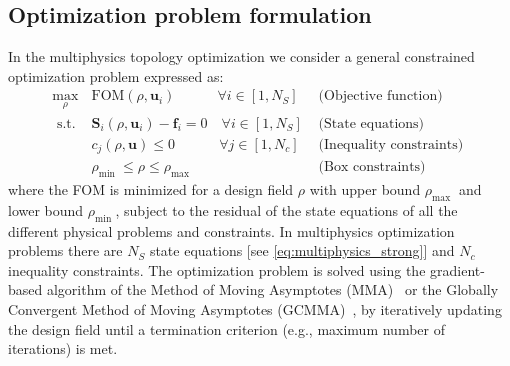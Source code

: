     \subsection*{Optimization problem formulation}
    In the multiphysics topology optimization we consider a general constrained optimization problem 
    expressed as:
    \begin{equation}
        \begin{array}{clr}
            \max\limits_{\rho}                        & \text{FOM}(\rho, \mathbf{u}_i) \quad \quad \quad 
             \forall i \in\left[1, N_S\right] & \text { (Objective function) }                                                         \\
            \text { s.t. }                            & \mathbf{S}_i(\rho, \mathbf{u}_i)-\mathbf{f}_i=0 \quad
            \forall i \in\left[1, N_S\right]          & \text { (State equations) }                                                            \\
                                                      & c_j(\rho, \mathbf{u}) \leq 0 \quad \quad \quad \, \forall j \in\left[1,
            N_c\right]                                & \text { (Inequality constraints) }                                                     \\
                                                      & \rho_{\text {min }} \leq \rho \leq \rho_{\text {max }}                  & \text { (Box
                constraints) }
        \end{array}
    \end{equation}
    where the FOM is minimized for a design field $\rho$ with upper
    bound $\rho_{\text {max }}$ and lower bound $\rho_{\text {min }}$,
    subject to the residual of the state equations of all the different physical
    problems and constraints. In multiphysics optimization problems
    there are $N_S$ state equations [see \eqref{eq:multiphysics_strong}]
    and  $N_c$ inequality constraints. The optimization problem is solved using
    the gradient-based algorithm of the Method of Moving
    Asymptotes (MMA)~\cite{MMA} or the Globally Convergent Method of Moving Asymptotes
    (GCMMA)~\cite{GCMMA}, by iteratively updating the design field until a
    termination criterion (e.g., maximum number of iterations) is met.

